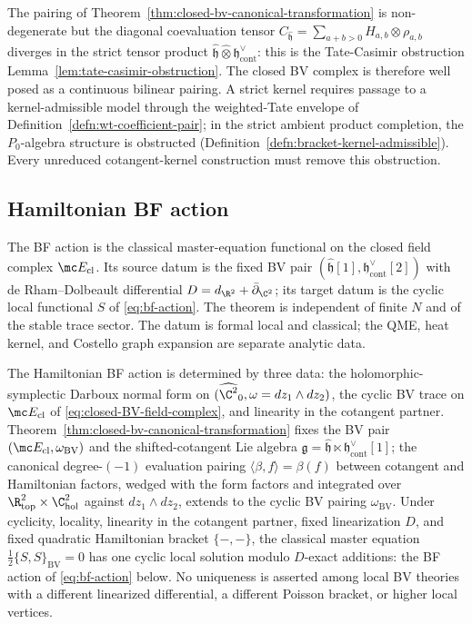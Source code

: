 \documentclass[11pt]{memoir}
\begin{document}
\begin{rmk}\label{rmk:closed-bv-casimir-obstruction}
  The pairing of Theorem~\ref{thm:closed-bv-canonical-transformation}
  is non-degenerate but the diagonal coevaluation tensor
  $C_{\widehat{\mathfrak h}}=\sum_{a+b>0}H_{a,b}\otimes\rho_{a,b}$
  diverges in the strict tensor product
  $\widehat{\mathfrak h}\widehat\otimes\mathfrak h^\vee_{\mathrm{cont}}$:
  this is the Tate-Casimir obstruction
  Lemma~\ref{lem:tate-casimir-obstruction}.  The closed BV complex is
  therefore well posed as a continuous bilinear pairing.  A strict
  kernel requires passage to a kernel-admissible model through the
  weighted-Tate envelope of
  Definition~\ref{defn:wt-coefficient-pair}; in the strict ambient
  product completion, the \(P_0\)-algebra structure is obstructed
  (Definition~\ref{defn:bracket-kernel-admissible}).  Every unreduced
  cotangent-kernel construction must remove this obstruction.
\end{rmk}

\subsection{Hamiltonian BF action}\label{ssec:hamiltonian-bf-action}

The BF action is the classical master-equation functional on the closed
field complex \(\mc E_{\mathrm{cl}}\).  Its source datum is the fixed
BV pair
\((\widehat{\mathfrak h}[1],\mathfrak h^\vee_{\mathrm{cont}}[2])\)
with de Rham--Dolbeault differential
\(D=d_{\R^2}+\bar\partial_{\C^2}\); its target datum is the cyclic
local functional \(S\) of \eqref{eq:bf-action}.  The theorem is
independent of finite \(N\) and of the stable trace sector.  The datum is
formal local and classical; the QME, heat kernel, and
Costello graph expansion are separate analytic data.

The Hamiltonian BF action is determined by three data: the
holomorphic-symplectic Darboux normal form on
\((\widehat{\C^2}_0,\omega=dz_1\wedge dz_2)\), the cyclic BV trace on
\(\mc E_{\mathrm{cl}}\) of
\eqref{eq:closed-BV-field-complex}, and linearity in the cotangent
partner. Theorem~\ref{thm:closed-bv-canonical-transformation} fixes
the BV pair
\((\mc E_{\mathrm{cl}},\omega_{\mathrm{BV}})\) and the
shifted-cotangent Lie algebra
$\mathfrak g=\widehat{\mathfrak h}\ltimes\mathfrak h^\vee_{\mathrm{cont}}[1]$;
the canonical degree-$(-1)$ evaluation pairing
$\langle\beta,f\rangle=\beta(f)$ between cotangent and Hamiltonian
factors, wedged with the form factors and integrated over
$\R^2_{\mathrm{top}}\times\C^2_{\mathrm{hol}}$ against $dz_1\wedge
dz_2$, extends to the cyclic BV pairing $\omega_{\mathrm{BV}}$. Under
cyclicity, locality, linearity in the cotangent partner, fixed
linearization \(D\), and fixed quadratic Hamiltonian bracket
\(\{-,-\}\), the classical master equation
\(\tfrac12\{S,S\}_{\mathrm{BV}}=0\) has one cyclic local solution modulo
\(D\)-exact additions: the BF action of \eqref{eq:bf-action} below.  No
uniqueness is asserted among local BV theories with a different
linearized differential, a different Poisson bracket, or higher local
vertices.
\end{document}
